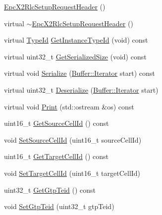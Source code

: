 \begin{DoxyCompactItemize}
\item 
\hyperlink{classns3_1_1EpcX2RlcSetupRequestHeader_abd9f0fb1da21be3709c67ef0798bb1b9}{Epc\+X2\+Rlc\+Setup\+Request\+Header} ()
\item 
virtual \hyperlink{classns3_1_1EpcX2RlcSetupRequestHeader_a31f93b23f17dc9119ed7038501b44d30}{$\sim$\+Epc\+X2\+Rlc\+Setup\+Request\+Header} ()
\item 
virtual \hyperlink{classns3_1_1TypeId}{Type\+Id} \hyperlink{classns3_1_1EpcX2RlcSetupRequestHeader_ac612fc04918c2a30077a867313eaed8f}{Get\+Instance\+Type\+Id} (void) const 
\item 
virtual uint32\+\_\+t \hyperlink{classns3_1_1EpcX2RlcSetupRequestHeader_a0c883e0abd95f4e16a235db4b48c4ddf}{Get\+Serialized\+Size} (void) const 
\item 
virtual void \hyperlink{classns3_1_1EpcX2RlcSetupRequestHeader_a714351da066ffbc670ab36c5f972871d}{Serialize} (\hyperlink{classns3_1_1Buffer_1_1Iterator}{Buffer\+::\+Iterator} start) const 
\item 
virtual uint32\+\_\+t \hyperlink{classns3_1_1EpcX2RlcSetupRequestHeader_ab64b80db08357eeb22e736e43a4cc354}{Deserialize} (\hyperlink{classns3_1_1Buffer_1_1Iterator}{Buffer\+::\+Iterator} start)
\item 
virtual void \hyperlink{classns3_1_1EpcX2RlcSetupRequestHeader_a9f40fc0ee09173a2f144e01cd736078b}{Print} (std\+::ostream \&os) const 
\item 
uint16\+\_\+t \hyperlink{classns3_1_1EpcX2RlcSetupRequestHeader_acfea838cb3d69e6caa4b19605a34c506}{Get\+Source\+Cell\+Id} () const 
\item 
void \hyperlink{classns3_1_1EpcX2RlcSetupRequestHeader_a9212adfa5892fc0533283c5dbe869830}{Set\+Source\+Cell\+Id} (uint16\+\_\+t source\+Cell\+Id)
\item 
uint16\+\_\+t \hyperlink{classns3_1_1EpcX2RlcSetupRequestHeader_a6056657503cc1a940c88a32a7b0f835b}{Get\+Target\+Cell\+Id} () const 
\item 
void \hyperlink{classns3_1_1EpcX2RlcSetupRequestHeader_ae258860b1e459884836180cdafd0287f}{Set\+Target\+Cell\+Id} (uint16\+\_\+t target\+Cell\+Id)
\item 
uint32\+\_\+t \hyperlink{classns3_1_1EpcX2RlcSetupRequestHeader_acceea06fddf6eecf0e87eca15d5fcf31}{Get\+Gtp\+Teid} () const 
\item 
void \hyperlink{classns3_1_1EpcX2RlcSetupRequestHeader_aa066c54b764bcc7b49871127544118aa}{Set\+Gtp\+Teid} (uint32\+\_\+t gtp\+Teid)
\item 

\end{DoxyCompactItemize}
